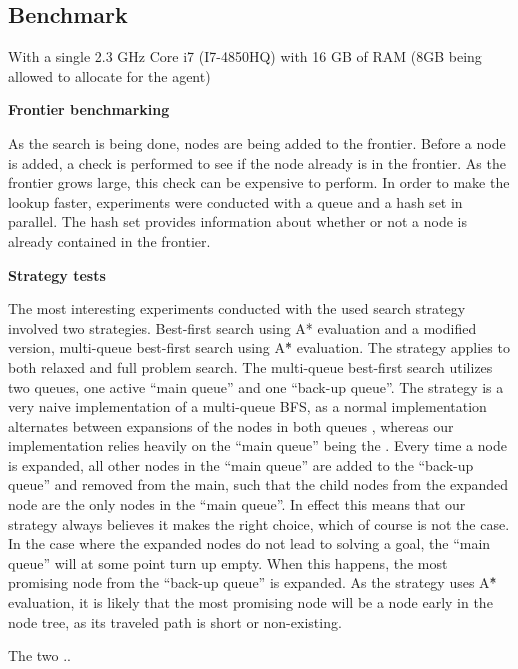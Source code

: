\documentclass[Main]{subfiles}
\begin{document}
\subsection{Benchmark}

With a single 2.3 GHz Core i7 (I7-4850HQ) with 16 GB of RAM (8GB being allowed to allocate for the agent)



\textbf{Frontier benchmarking}

As the search is being done, nodes are being added to the frontier. Before a node is added, a check is performed to see if the node already is in the frontier. As the frontier grows large, this check can be expensive to perform. In order to make the lookup faster, experiments were conducted with a queue and a hash set in parallel. The hash set provides information about whether or not a node is already contained in the frontier.





\textbf{Strategy tests}

The most interesting experiments conducted with the used search strategy involved two strategies. Best-first search using A* evaluation and a modified version, multi-queue best-first search using A\^{*} evaluation. The strategy applies to both relaxed and full problem search. 
The multi-queue best-first search utilizes two queues, one active ``main queue'' and one ``back-up queue''. The strategy is a very naive implementation of a multi-queue BFS, as a normal implementation alternates between expansions of the nodes in both queues \cite{hector2013a}, whereas our implementation relies heavily on the ``main queue'' being the . Every time a node is expanded, all other nodes in the ``main queue'' are added to the ``back-up queue'' and removed from the main, such that the child nodes from the expanded node are the only nodes in the ``main queue''. In effect this means that our strategy always believes it makes the right choice, which of course is not the case. In the case where the expanded nodes do not lead to solving a goal, the ``main queue'' will at some point turn up empty. When this happens, the most promising node from the ``back-up queue'' is expanded. As the strategy uses A\^{*} evaluation, it is likely that the most promising node will be a node early in the node tree, as its traveled path is short or non-existing. 


The two .. 
\end{document}
